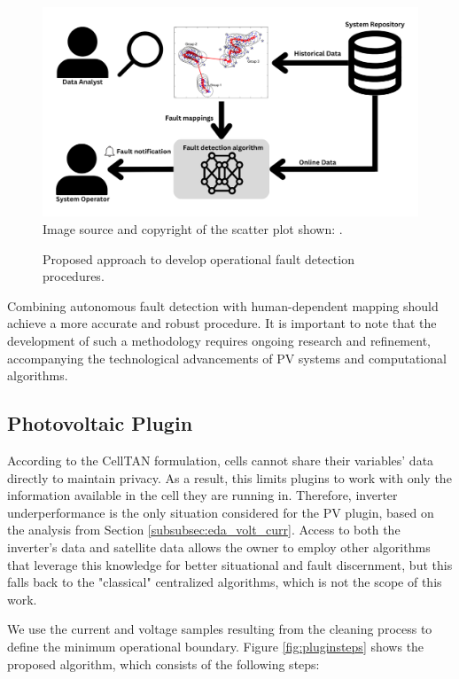 \begin{figure}[h!]
    \centering
    \includegraphics[width=\textwidth]{figures/chapter5/algorithm/approach_fault_detection.png}
    Image source and copyright of the scatter plot shown: \cite{Kumpulainen2007}.
    \caption{Proposed approach to develop operational fault detection procedures.}
    \label{fig:approach_fault_detection}
\end{figure}

Combining autonomous fault detection with human-dependent mapping should achieve a more accurate and robust procedure. It is important to note that the development of such a methodology requires ongoing research and refinement, accompanying the technological advancements of PV systems and computational algorithms.

\subsection{Photovoltaic Plugin}

According to the CellTAN formulation, cells cannot share their variables' data directly to maintain privacy. As a result, this limits plugins to work with only the information available in the cell they are running in. Therefore, inverter underperformance is the only situation considered for the PV plugin, based on the analysis from Section \ref{subsubsec:eda_volt_curr}. Access to both the inverter's data and satellite data allows the owner to employ other algorithms that leverage this knowledge for better situational and fault discernment, but this falls back to the "classical" centralized algorithms, which is not the scope of this work.

We use the current and voltage samples resulting from the cleaning process to define the minimum operational boundary. Figure \ref{fig:pluginsteps} shows the proposed algorithm, which consists of the following steps:

